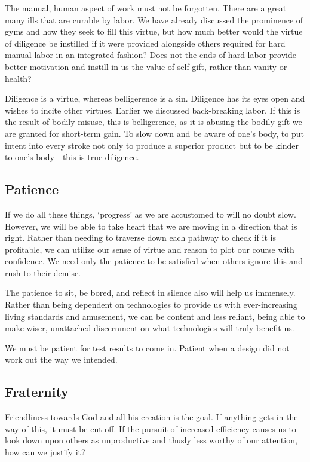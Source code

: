 \documentclass[letterpaper]{article}
\begin{document}
The manual, human aspect of work must not be forgotten. There are a great many ills that are curable by labor. We have already discussed the prominence of gyms and how they seek to fill this virtue, but how much better would the virtue of diligence be instilled if it were provided alongside others required for hard manual labor in an integrated fashion? Does not the ends of hard labor provide better motivation and instill in us the value of self-gift, rather than vanity or health?

Diligence is a virtue, whereas belligerence is a sin. Diligence has its eyes open and wishes to incite other virtues. Earlier we discussed back-breaking labor. If this is the result of bodily misuse, this is belligerence, as it is abusing the bodily gift we are granted for short-term gain. To slow down and be aware of one's body, to put intent into every stroke not only to produce a superior product but to be kinder to one's body - this is true diligence.

\subsection{Patience}

If we do all these things, `progress' as we are accustomed to will no doubt slow. However, we will be able to take heart that we are moving in a direction that is right. Rather than needing to traverse down each pathway to check if it is profitable, we can utilize our sense of virtue and reason to plot our course with confidence. We need only the patience to be satisfied when others ignore this and rush to their demise.

The patience to sit, be bored, and reflect in silence also will help us immensely. Rather than being dependent on technologies to provide us with ever-increasing living standards and amusement, we can be content and less reliant, being able to make wiser, unattached discernment on what technologies will truly benefit us.

We must be patient for test results to come in. Patient when a design did not work out the way we intended.

\subsection{Fraternity}

Friendliness towards God and all his creation is the goal. If anything gets in the way of this, it must be cut off. If the pursuit of increased efficiency causes us to look down upon others as unproductive and thusly less worthy of our attention, how can we justify it?
\end{document}
